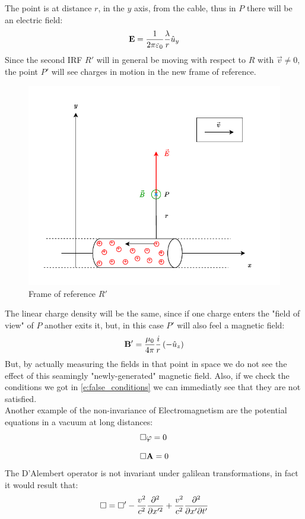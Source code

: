 The point is at distance $r$, in the $y$ axis, from the cable, thus in $P$ there will be an electric field:
\begin{equation}
  \vb{E} = \dfrac{1}{2 \pi \varepsilon_0}\dfrac{\lambda}{r}\hat{u}_y
\end{equation}
Since the second IRF $R'$ will in general be moving with respect to $R$ with $\vec{v} \neq 0$, the point $P'$ will see charges in motion in the new frame of reference.
\begin{figure}[H]
  \centering
  \includegraphics[width=0.6\linewidth]{res/svg/moving_cable.drawio}
  \caption{Frame of reference $R'$}
\end{figure}
The linear charge density will be the same, since if one charge enters the "field of view" of $P$ another exits it, but, in this case $P'$ will also feel a magnetic field:
\begin{equation}
  \vb{B}' = \dfrac{\mu_0}{4 \pi}\dfrac{i}{r}\left(-\hat{u}_z\right)
\end{equation}
But, by actually measuring the fields in that point in space we do not see the effect of this seamingly "newly-generated" magnetic field. Also, if we check the conditions we got in \eqref{e:false_conditions} we can immediatly see that they are not satisfied.\\
Another example of the non-invariance of Electromagnetism are the potential equations in a vacuum at long distances:
\begin{equation}
  \begin{split}
    &\square \varphi = 0\\[8pt]
    &\square \vb{A} = 0
  \end{split}
\end{equation}
The D'Alembert operator is not invariant under galilean transformations, in fact it would result that:
\begin{equation}
  \dalop = \dalop' -\dfrac{v^2}{c^2} \dfrac{\partial^2}{\partial x'^2} + \dfrac{v^2}{c^2} \pdv{}{x'}{t'}
\end{equation}
